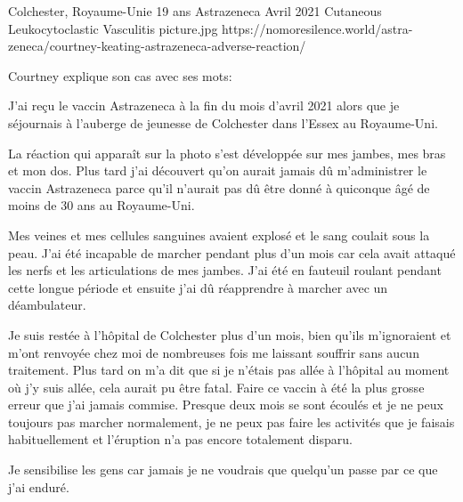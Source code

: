           {Colchester, Royaume-Unie}
          {19 ans}
          {Astrazeneca}
          {Avril 2021}
          {Cutaneous Leukocytoclastic Vasculitis}
          {picture.jpg}
          {https://nomoresilence.world/astra-zeneca/courtney-keating-astrazeneca-adverse-reaction/}
          {

Courtney explique son cas avec ses mots:

J'ai reçu le vaccin Astrazeneca à la fin du mois d'avril 2021 alors que je
séjournais à l'auberge de jeunesse de Colchester dans l'Essex au Royaume-Uni.

La réaction qui apparaît sur la photo s'est développée sur mes jambes, mes bras
et mon dos. Plus tard j'ai découvert qu'on aurait jamais dû m'administrer le
vaccin Astrazeneca parce qu'il n'aurait pas dû être donné à quiconque âgé de
moins de 30 ans au Royaume-Uni.

Mes veines et mes cellules sanguines avaient explosé et le sang coulait sous la
peau. J'ai été incapable de marcher pendant plus d'un mois car cela avait
attaqué les nerfs et les articulations de mes jambes. J'ai été en fauteuil
roulant pendant cette longue période et ensuite j'ai dû réapprendre à marcher
avec un déambulateur.

Je suis restée à l'hôpital de Colchester plus d'un mois, bien qu'ils
m'ignoraient et m'ont renvoyée chez moi de nombreuses fois me laissant souffrir
sans aucun traitement. Plus tard on m'a dit que si je n'étais pas allée à
l'hôpital au moment où j'y suis allée, cela aurait pu être fatal. Faire ce
vaccin à été la plus grosse erreur que j'ai jamais commise. Presque deux mois se
sont écoulés et je ne peux toujours pas marcher normalement, je ne peux pas
faire les activités que je faisais habituellement et l'éruption n'a pas encore
totalement disparu.

Je sensibilise les gens car jamais je ne voudrais que quelqu'un passe par ce que
j'ai enduré.

}
